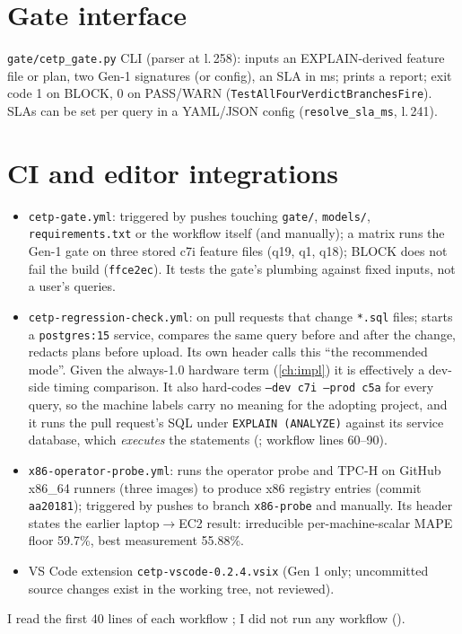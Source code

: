 \section{Gate interface}
\texttt{gate/cetp\_gate.py} CLI (parser at l.\,258): inputs an EXPLAIN-derived feature file or plan, two Gen-1 signatures (or config), an SLA in ms; prints a report; exit code 1 on BLOCK, 0 on PASS/WARN
(\texttt{TestAllFourVerdictBranchesFire}). SLAs can be set per query in a YAML/JSON config (\texttt{resolve\_sla\_ms}, l.\,241).

\section{CI and editor integrations}
\begin{itemize}
\item \texttt{cetp-gate.yml}: triggered by pushes touching \texttt{gate/}, \texttt{models/}, \texttt{requirements.txt} or the workflow itself (and manually); a matrix runs the Gen-1 gate on three stored c7i feature files (q19, q1, q18); BLOCK does not fail the build (\texttt{ffce2ec}). It tests the gate's plumbing against fixed inputs, not a user's queries.
\item \texttt{cetp-regression-check.yml}: on pull requests that change \texttt{*.sql} files; starts a \texttt{postgres:15} service, compares the same query before and after the change, redacts plans before upload. Its own header calls this ``the recommended mode''. Given the always-1.0 hardware term (\cref{ch:impl}) it is effectively a dev-side timing comparison. It also hard-codes \texttt{--dev c7i --prod c5a} for every query, so the machine labels carry no meaning for the adopting project, and it runs the pull request's SQL under \texttt{EXPLAIN (ANALYZE)} against its service database, which \emph{executes} the statements (\evCODE; workflow lines 60--90).
\item \texttt{x86-operator-probe.yml}: runs the operator probe and TPC-H on GitHub x86\_64 runners (three images) to produce x86 registry entries (commit \texttt{aa20181}); triggered by pushes to branch \texttt{x86-probe} and manually. Its header states the earlier laptop$\to$EC2 result: irreducible per-machine-scalar MAPE floor 59.7\%, best measurement 55.88\%.
\item VS Code extension \texttt{cetp-vscode-0.2.4.vsix} (Gen 1 only; uncommitted source changes exist in the working tree, not reviewed).
\end{itemize}
I read the first 40 lines of each workflow \evCODE; I did not run any workflow (\evUNK).

